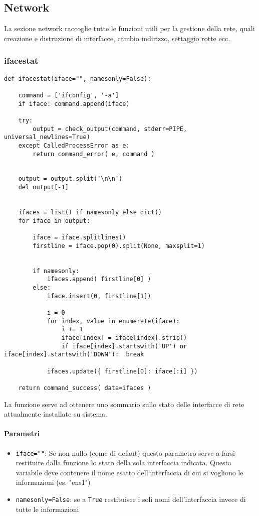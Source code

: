 \documentclass[11pt]{article}
\begin{document}
\subsection{Network}\label{network}
La sezione network raccoglie tutte le funzioni utili per la gestione della rete, quali creazione e distruzione
di interfacce, cambio indirizzo, settaggio rotte ecc.
\subsubsection{ifacestat}\label{ifacestat}
\begin{lstlisting}
def ifacestat(iface="", namesonly=False):

    command = ['ifconfig', '-a']
    if iface: command.append(iface)

    try:
        output = check_output(command, stderr=PIPE, universal_newlines=True)
    except CalledProcessError as e:
        return command_error( e, command )


    output = output.split('\n\n')
    del output[-1]


    ifaces = list() if namesonly else dict()
    for iface in output:

        iface = iface.splitlines()
        firstline = iface.pop(0).split(None, maxsplit=1)


        if namesonly:
            ifaces.append( firstline[0] )
        else:
            iface.insert(0, firstline[1])

            i = 0
            for index, value in enumerate(iface):
                i += 1
                iface[index] = iface[index].strip()
                if iface[index].startswith('UP') or iface[index].startswith('DOWN'):  break

            ifaces.update({ firstline[0]: iface[:i] })

    return command_success( data=ifaces )
\end{lstlisting}
La funzione serve ad ottenere uno sommario sullo stato delle interfacce di rete attualmente installate su sistema.
\paragraph{Parametri}
\begin{itemize}
	\item{\texttt{iface=""}: Se non nullo (come di defaut) questo parametro serve a farsi restituire dalla funzione
		lo stato della sola interfaccia indicata. Questa variabile deve contenere il nome esatto dell'interfaccia
		di cui si vogliono le informazioni (es. "ens1")}
	\item{\texttt{namesonly=False}: se a \texttt{True} restituisce i soli nomi dell'interfaccia
		invece di tutte le informazioni}
\end{itemize}
\end{document}
